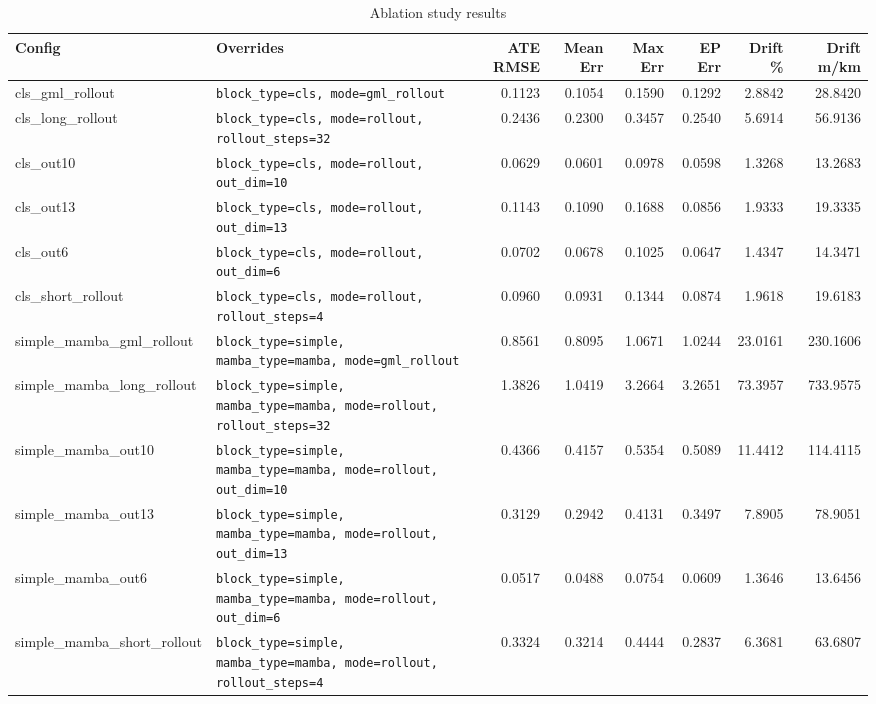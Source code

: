 \begin{table}[ht]
\centering
\caption{Ablation study results}
\label{tab:ablation}
\small
\setlength{\tabcolsep}{4pt}
\begin{tabular}{ll rr rr rr}
\toprule
\textbf{Config} & \textbf{Overrides} &
\textbf{ATE RMSE} & \textbf{Mean Err} &
\textbf{Max Err} & \textbf{EP Err} &
\textbf{Drift \%} & \textbf{Drift m/km} \\
\midrule
cls\_gml\_rollout & \texttt{block\_type=cls, mode=gml\_rollout} & 0.1123 & 0.1054 & 0.1590 & 0.1292 & 2.8842 & 28.8420 \\
cls\_long\_rollout & \texttt{block\_type=cls, mode=rollout, rollout\_steps=32} & 0.2436 & 0.2300 & 0.3457 & 0.2540 & 5.6914 & 56.9136 \\
cls\_out10 & \texttt{block\_type=cls, mode=rollout, out\_dim=10} & 0.0629 & 0.0601 & 0.0978 & 0.0598 & 1.3268 & 13.2683 \\
cls\_out13 & \texttt{block\_type=cls, mode=rollout, out\_dim=13} & 0.1143 & 0.1090 & 0.1688 & 0.0856 & 1.9333 & 19.3335 \\
cls\_out6 & \texttt{block\_type=cls, mode=rollout, out\_dim=6} & 0.0702 & 0.0678 & 0.1025 & 0.0647 & 1.4347 & 14.3471 \\
cls\_short\_rollout & \texttt{block\_type=cls, mode=rollout, rollout\_steps=4} & 0.0960 & 0.0931 & 0.1344 & 0.0874 & 1.9618 & 19.6183 \\
simple\_mamba\_gml\_rollout & \texttt{block\_type=simple, mamba\_type=mamba, mode=gml\_rollout} & 0.8561 & 0.8095 & 1.0671 & 1.0244 & 23.0161 & 230.1606 \\
simple\_mamba\_long\_rollout & \texttt{block\_type=simple, mamba\_type=mamba, mode=rollout, rollout\_steps=32} & 1.3826 & 1.0419 & 3.2664 & 3.2651 & 73.3957 & 733.9575 \\
simple\_mamba\_out10 & \texttt{block\_type=simple, mamba\_type=mamba, mode=rollout, out\_dim=10} & 0.4366 & 0.4157 & 0.5354 & 0.5089 & 11.4412 & 114.4115 \\
simple\_mamba\_out13 & \texttt{block\_type=simple, mamba\_type=mamba, mode=rollout, out\_dim=13} & 0.3129 & 0.2942 & 0.4131 & 0.3497 & 7.8905 & 78.9051 \\
simple\_mamba\_out6 & \texttt{block\_type=simple, mamba\_type=mamba, mode=rollout, out\_dim=6} & 0.0517 & 0.0488 & 0.0754 & 0.0609 & 1.3646 & 13.6456 \\
simple\_mamba\_short\_rollout & \texttt{block\_type=simple, mamba\_type=mamba, mode=rollout, rollout\_steps=4} & 0.3324 & 0.3214 & 0.4444 & 0.2837 & 6.3681 & 63.6807 \\
\bottomrule
\end{tabular}
\end{table}
